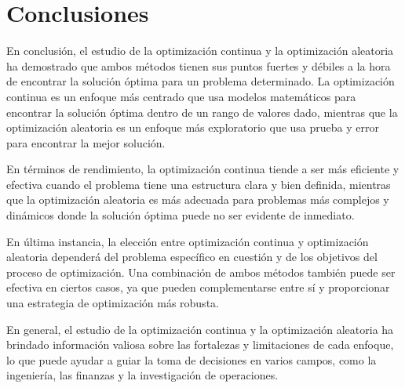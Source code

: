 \documentclass{article}
\begin{document}
\newpage
\section*{Conclusiones}

En conclusión, el estudio de la optimización continua y la optimización aleatoria ha demostrado que ambos métodos tienen sus puntos fuertes y débiles a la hora de encontrar la solución óptima para un problema determinado. La optimización continua es un enfoque más centrado que usa modelos matemáticos para encontrar la solución óptima dentro de un rango de valores dado, mientras que la optimización aleatoria es un enfoque más exploratorio que usa prueba y error para encontrar la mejor solución.

En términos de rendimiento, la optimización continua tiende a ser más eficiente y efectiva cuando el problema tiene una estructura clara y bien definida, mientras que la optimización aleatoria es más adecuada para problemas más complejos y dinámicos donde la solución óptima puede no ser evidente de inmediato.

En última instancia, la elección entre optimización continua y optimización aleatoria dependerá del problema específico en cuestión y de los objetivos del proceso de optimización. Una combinación de ambos métodos también puede ser efectiva en ciertos casos, ya que pueden complementarse entre sí y proporcionar una estrategia de optimización más robusta.

En general, el estudio de la optimización continua y la optimización aleatoria ha brindado información valiosa sobre las fortalezas y limitaciones de cada enfoque, lo que puede ayudar a guiar la toma de decisiones en varios campos, como la ingeniería, las finanzas y la investigación de operaciones.

\newpage
\end{document}
